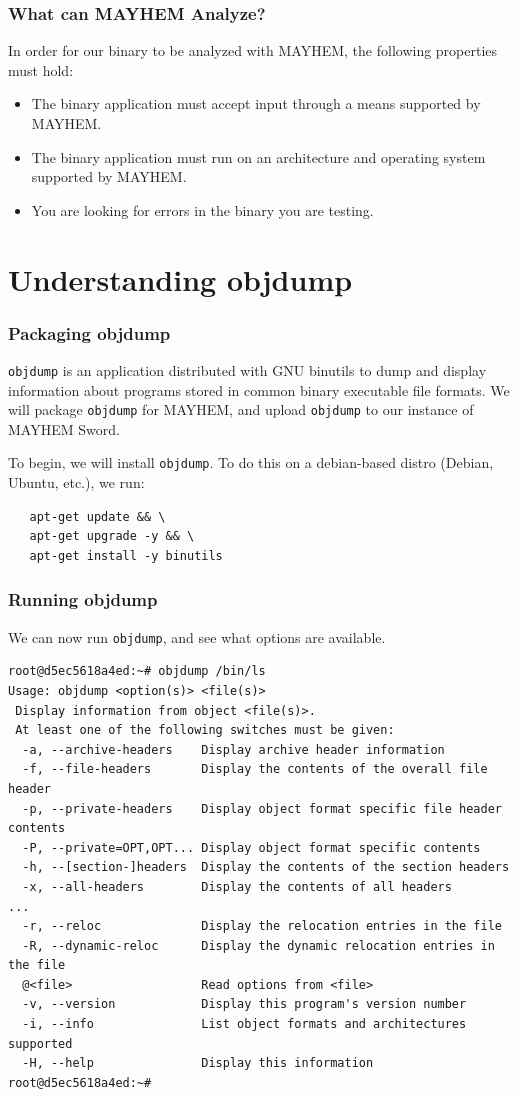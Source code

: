 \documentclass{beamer}
\begin{document}
\begin{frame}
\frametitle{What can MAYHEM Analyze?}
In order for our binary to be analyzed with MAYHEM, the following properties must hold:

\begin{itemize}
  \item The binary application must accept input through a means supported by MAYHEM.
  \item The binary application must run on an architecture and operating system supported by MAYHEM.
  \item You are looking for errors in the binary you are testing.
\end{itemize}
\end{frame}


\section{Understanding objdump}

\begin{frame}[fragile]
\frametitle{Packaging objdump}
\texttt{objdump} is an application distributed with GNU binutils to dump and display information about programs stored in common binary executable file formats. We will package \texttt{objdump} for MAYHEM, and upload \texttt{objdump} to our instance of MAYHEM Sword.

To begin, we will install \texttt{objdump}. To do this on a debian-based distro (Debian, Ubuntu, etc.), we run:

\begin{lstlisting}
   apt-get update && \
   apt-get upgrade -y && \
   apt-get install -y binutils
\end{lstlisting}
\end{frame}

\begin{frame}[fragile]
\frametitle{Running objdump}
We can now run \texttt{objdump}, and see what options are available.

\begin{lstlisting}[basicstyle=\tiny]
root@d5ec5618a4ed:~# objdump /bin/ls
Usage: objdump <option(s)> <file(s)>
 Display information from object <file(s)>.
 At least one of the following switches must be given:
  -a, --archive-headers    Display archive header information
  -f, --file-headers       Display the contents of the overall file header
  -p, --private-headers    Display object format specific file header contents
  -P, --private=OPT,OPT... Display object format specific contents
  -h, --[section-]headers  Display the contents of the section headers
  -x, --all-headers        Display the contents of all headers
...
  -r, --reloc              Display the relocation entries in the file
  -R, --dynamic-reloc      Display the dynamic relocation entries in the file
  @<file>                  Read options from <file>
  -v, --version            Display this program's version number
  -i, --info               List object formats and architectures supported
  -H, --help               Display this information
root@d5ec5618a4ed:~# 
\end{lstlisting}
\end{frame}
\end{document}
